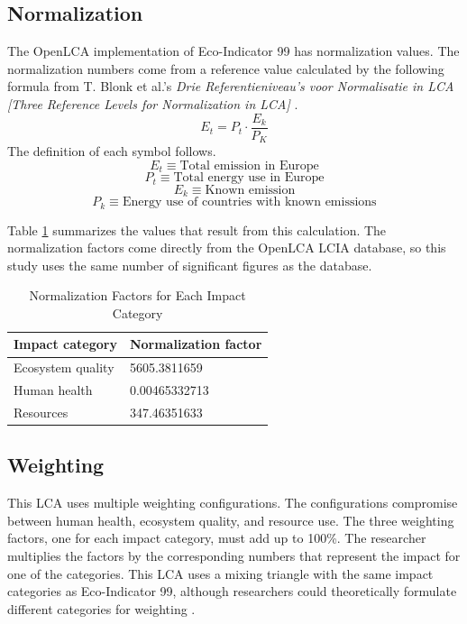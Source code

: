 \documentclass[final,journal,10pt,letterpaper,oneside,twocolumn,compsoc]%
{IEEEtran}
\begin{document}
\subsection{Normalization}
The OpenLCA implementation of Eco-Indicator 99 has
normalization values. The normalization numbers come from a reference value
calculated by the following formula from T. Blonk et al.'s \textit{Drie
Referentieniveau's voor Normalisatie in LCA [Three Reference Levels for
Normalization in LCA]} \cite{blonk} \cite{pre-annex}. 
\begin{equation}
  E_t = P_t \cdot \frac{E_k}{P_K}
\end{equation}
The definition of each symbol follows.
\begin{equation}
  E_t \equiv \textrm{Total emission in Europe}
\end{equation}
\begin{equation}
  P_t \equiv \textrm{Total energy use in Europe}
\end{equation}
\begin{equation}
  E_k \equiv \textrm{Known emission}
\end{equation}
\begin{equation}
  P_k \equiv \textrm{Energy use of countries with known emissions}
\end{equation}

Table \ref{tab:9} summarizes the values that result from this calculation. The
normalization factors come directly from the OpenLCA LCIA database, so this
study uses the same number of significant figures as the database.

\begin{table}[t!]
  \caption{Normalization Factors for Each Impact Category}
  \label{tab:9}
  \centering
    \begin{tabular}{| l | l |}
      \hline
      Impact category   & Normalization factor \\
      \hline
      Ecosystem quality & 5605.3811659 \\
      Human health      & 0.00465332713 \\
      Resources         & 347.46351633 \\
      \hline
    \end{tabular}
\end{table}

\subsection{Weighting}
This LCA uses multiple weighting configurations. The configurations compromise
between human health, ecosystem quality, and resource use.
The three weighting factors, one for each impact category, must add up to 100\%.
The researcher multiplies the factors by the corresponding numbers that
represent the impact for one of the categories.
This LCA uses a mixing triangle with the
same impact categories as Eco-Indicator 99, although researchers could
theoretically formulate different categories for weighting \cite{triangle}.
\end{document}

